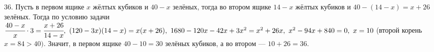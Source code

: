 36. Пусть в первом ящике $x$ жёлтых кубиков и $40-x$ зелёных, тогда во втором ящике $14-x$ жёлтых кубиков и $40-(14-x)=x+26$ зелёных. Тогда по условию задачи $\cfrac{40-x}{x}\cdot3=\cfrac{x+26}{14-x},\ (120-3x)(14-x)=x(x+26),\ 1680-120x-42x+3x^2=x^2+26x,\ x^2-94x+840=0,\ x=10$ (второй корень $x=84>40).$ Значит, в первом ящике $40-10=30$ зелёных кубиков, а во втором --- $10+26=36.$\\
